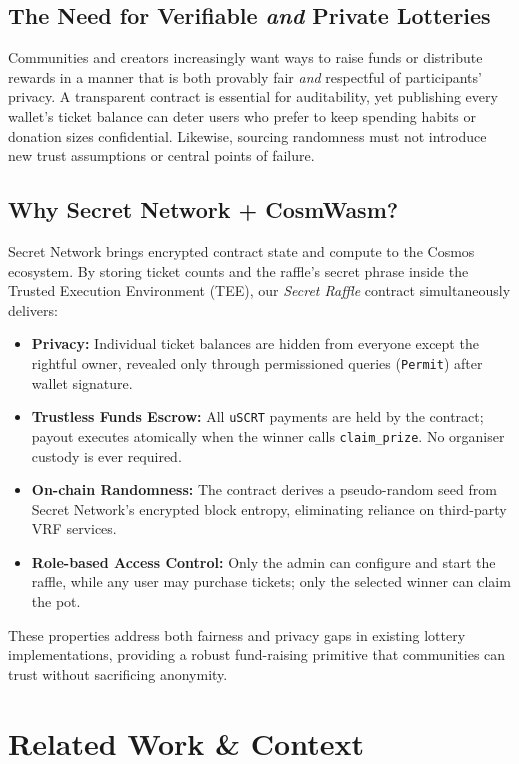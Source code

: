 \documentclass[12pt]{article}
\begin{document}
\subsection*{The Need for Verifiable \emph{and} Private Lotteries}
Communities and creators increasingly want ways to raise funds or distribute rewards in a manner that is both provably fair \emph{and} respectful of participants' privacy.  A transparent contract is essential for auditability, yet publishing every wallet's ticket balance can deter users who prefer to keep spending habits or donation sizes confidential.  Likewise, sourcing randomness must not introduce new trust assumptions or central points of failure.

\subsection*{Why Secret Network + CosmWasm?}
Secret Network brings encrypted contract state and compute to the Cosmos ecosystem.  By storing ticket counts and the raffle's secret phrase inside the Trusted Execution Environment (TEE), our \emph{Secret Raffle} contract simultaneously delivers:

\begin{itemize}
  \item \textbf{Privacy:} Individual ticket balances are hidden from everyone except the rightful owner, revealed only through permissioned queries (\texttt{Permit}) after wallet signature.
  \item \textbf{Trustless Funds Escrow:} All \texttt{uSCRT} payments are held by the contract; payout executes atomically when the winner calls \texttt{claim\_prize}.  No organiser custody is ever required.
  \item \textbf{On-chain Randomness:} The contract derives a pseudo-random seed from Secret Network's encrypted block entropy, eliminating reliance on third-party VRF services.
  \item \textbf{Role-based Access Control:} Only the admin can configure and start the raffle, while any user may purchase tickets; only the selected winner can claim the pot.
\end{itemize}

These properties address both fairness and privacy gaps in existing lottery implementations, providing a robust fund-raising primitive that communities can trust without sacrificing anonymity.

\section*{Related Work \& Context}
\end{document}
